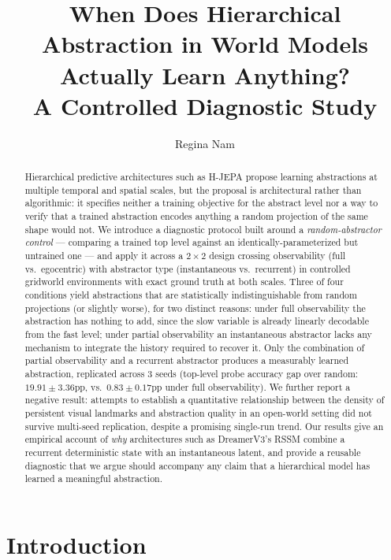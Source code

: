 \documentclass[11pt]{article}
\title{When Does Hierarchical Abstraction in World Models Actually Learn Anything?\\
\large A Controlled Diagnostic Study}
\author[1]{Regina Nam}
\affil[1]{Ionosphere Institute}
\date{}
\begin{document}
\maketitle

\begin{abstract}
Hierarchical predictive architectures such as H-JEPA \citep{lecun2022path} propose learning abstractions at multiple temporal and spatial scales, but the proposal is architectural rather than algorithmic: it specifies neither a training objective for the abstract level nor a way to verify that a trained abstraction encodes anything a random projection of the same shape would not. We introduce a diagnostic protocol built around a \emph{random-abstractor control} --- comparing a trained top level against an identically-parameterized but untrained one --- and apply it across a $2\times2$ design crossing observability (full vs.\ egocentric) with abstractor type (instantaneous vs.\ recurrent) in controlled gridworld environments with exact ground truth at both scales. Three of four conditions yield abstractions that are statistically indistinguishable from random projections (or slightly worse), for two distinct reasons: under full observability the abstraction has nothing to add, since the slow variable is already linearly decodable from the fast level; under partial observability an instantaneous abstractor lacks any mechanism to integrate the history required to recover it. Only the combination of partial observability and a recurrent abstractor produces a measurably learned abstraction, replicated across 3 seeds (top-level probe accuracy gap over random: $19.91\pm3.36$pp, vs.\ $0.83\pm0.17$pp under full observability). We further report a negative result: attempts to establish a quantitative relationship between the density of persistent visual landmarks and abstraction quality in an open-world setting did not survive multi-seed replication, despite a promising single-run trend. Our results give an empirical account of \emph{why} architectures such as DreamerV3's RSSM \citep{hafner2023dreamerv3} combine a recurrent deterministic state with an instantaneous latent, and provide a reusable diagnostic that we argue should accompany any claim that a hierarchical model has learned a meaningful abstraction.
\end{abstract}

\section{Introduction}
\end{document}
